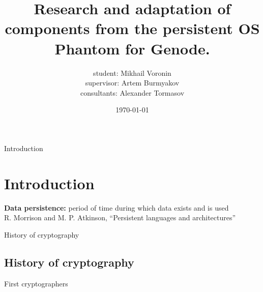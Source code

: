 \documentclass{beamer}
\title{Research and adaptation of components from the persistent OS Phantom for Genode.}
\author{student: Mikhail Voronin\\supervisor: Artem Burmyakov\\consultants: Alexander Tormasov}
\date{\monthYear\today}
\begin{document}
\frame{
	\titlepage
}


\begin{frame}{Introduction}
    \section{Introduction}
    \textbf{Data persistence:} period of time during which data exists and is used\\
    \scriptsize{R. Morrison and M. P. Atkinson, “Persistent languages and architectures”}
\end{frame}

\begin{frame}{History of cryptography}
    \subsection{History of cryptography}
    \begin{center}
        \begin{minipage}{0.48\linewidth}
        \end{minipage}
        
        \hfill
        
        \begin{minipage}{0.49\linewidth}
        \end{minipage}
        
    \end{center}
\end{frame}

\begin{frame}{First cryptographers}
    \begin{center}
        \begin{minipage}{0.45\linewidth}
        \end{minipage}
        \hfill
        \begin{minipage}{0.45\linewidth}
            \begin{center}
            \end{center}
        \end{minipage}            
    \end{center}
\end{frame}
\end{document}
